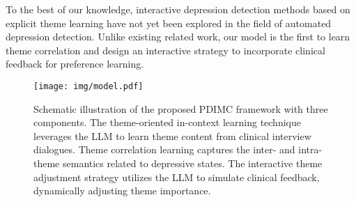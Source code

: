 To the best of our knowledge, interactive depression detection methods based on explicit theme learning have not yet been explored in the field of automated depression detection. Unlike existing related work, our model is the first to learn theme correlation and design an interactive strategy to incorporate clinical feedback for preference learning.

\begin{figure*}[ht]
\centering
\begin{center}
\centerline{\texttt{[image: img/model.pdf]}}
\caption{
Schematic illustration of the proposed PDIMC framework with three components. The theme-oriented in-context learning technique leverages the LLM to learn theme content from clinical interview dialogues. Theme correlation learning captures the inter- and intra-theme semantics related to depressive states. The interactive theme adjustment strategy utilizes the LLM to simulate clinical feedback, dynamically adjusting theme importance.
}
\label{fig:model}
\end{center}
\end{figure*}